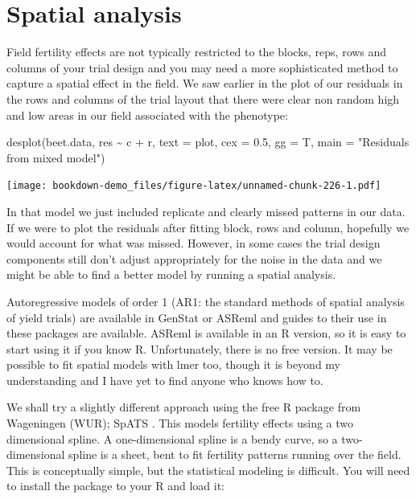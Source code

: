 \documentclass[
]{book}
\newenvironment{Shaded}{\begin{snugshade}}{\end{snugshade}}
\newcommand{\AttributeTok}[1]{\textcolor[rgb]{0.77,0.63,0.00}{#1}}
\newcommand{\FloatTok}[1]{\textcolor[rgb]{0.00,0.00,0.81}{#1}}
\newcommand{\FunctionTok}[1]{\textcolor[rgb]{0.00,0.00,0.00}{#1}}
\newcommand{\NormalTok}[1]{#1}
\newcommand{\SpecialCharTok}[1]{\textcolor[rgb]{0.00,0.00,0.00}{#1}}
\newcommand{\StringTok}[1]{\textcolor[rgb]{0.31,0.60,0.02}{#1}}
\begin{document}
\hypertarget{spatial-analysis}{%
\section{Spatial analysis}\label{spatial-analysis}}

Field fertility effects are not typically restricted to the blocks, reps, rows and columns of your trial design and you may need a more sophisticated method to capture a spatial effect in the field. We saw earlier in the plot of our residuals in the rows and columns of the trial layout that there were clear non random high and low areas in our field associated with the phenotype:

\begin{Shaded}
\begin{Highlighting}[]
\FunctionTok{desplot}\NormalTok{(beet.data, res }\SpecialCharTok{\textasciitilde{}}\NormalTok{ c }\SpecialCharTok{+}\NormalTok{ r, }\AttributeTok{text =}\NormalTok{ plot, }\AttributeTok{cex =} \FloatTok{0.5}\NormalTok{, }\AttributeTok{gg =}\NormalTok{ T, }
    \AttributeTok{main =} \StringTok{"Residuals from mixed model"}\NormalTok{)}
\end{Highlighting}
\end{Shaded}

\texttt{[image: bookdown-demo\_files/figure-latex/unnamed-chunk-226-1.pdf]}

In that model we just included replicate and clearly missed patterns in our data. If we were to plot the residuals after fitting block, rows and column, hopefully we would account for what was missed. However, in some cases the trial design components still don't adjust appropriately for the noise in the data and we might be able to find a better model by running a spatial analysis.

Autoregressive models of order 1 (AR1: the standard methods of spatial analysis of yield trials) are available in GenStat or ASReml and guides to their use in these packages are available. ASReml is available in an R version, so it is easy to start using it if you know R. Unfortunately, there is no free version. It may be possible to fit spatial models with lmer too, though it is beyond my understanding and I have yet to find anyone who knows how to.

We shall try a slightly different approach using the free R package from Wageningen (WUR); SpATS \citep{SpATS2017}. This models fertility effects using a two dimensional spline. A one-dimensional spline is a bendy curve, so a two-dimensional spline is a sheet, bent to fit fertility patterns running over the field. This is conceptually simple, but the statistical modeling is difficult. You will need to install the package to your R and load it:
\end{document}
